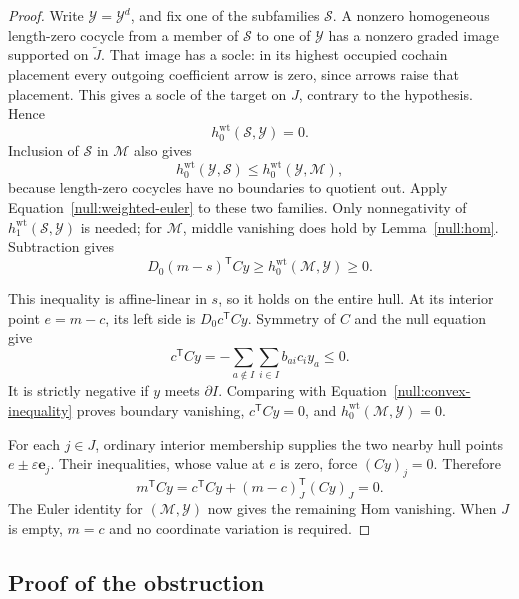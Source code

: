\begin{proof}
Write $\mathcal Y=\mathcal Y^d$, and fix one of the subfamilies
$\mathcal S$.  A nonzero homogeneous length-zero cocycle from a
member of $\mathcal S$ to one of $\mathcal Y$ has a nonzero graded
image supported on $\widetilde J$.  That image has a socle: in its
highest occupied cochain placement every outgoing coefficient arrow
is zero, since arrows raise that placement.  This gives a socle of
the target on $J$, contrary to the hypothesis.  Hence
\[
 h_0^{\mathrm{wt}}(\mathcal S,\mathcal Y)=0.
\]
Inclusion of $\mathcal S$ in $\mathcal M$ also gives
\[
 h_0^{\mathrm{wt}}(\mathcal Y,\mathcal S)
   \le h_0^{\mathrm{wt}}(\mathcal Y,\mathcal M),
\]
because length-zero cocycles have no boundaries to quotient out.
Apply Equation~\eqref{null:weighted-euler} to these two families.
Only nonnegativity of $h_1^{\mathrm{wt}}(\mathcal S,\mathcal Y)$
is needed; for $\mathcal M$, middle vanishing does hold by
Lemma~\ref{null:hom}.  Subtraction gives
\begin{equation}
 D_0(m-s)^{\mathsf T}Cy
     \ge h_0^{\mathrm{wt}}(\mathcal M,\mathcal Y)\ge0.
 \label{null:convex-inequality}
\end{equation}

This inequality is affine-linear in $s$, so it holds on the entire
hull.  At its interior point $e=m-c$, its left side is
$D_0c^{\mathsf T}Cy$.  Symmetry of $C$ and the null equation give
\begin{equation}
 c^{\mathsf T}Cy
    =-\sum_{a\notin I}\sum_{i\in I}b_{ai}c_i y_a\le0.
 \label{null:boundary-sign}
\end{equation}
It is strictly negative if $y$ meets $\partial I$.  Comparing with
Equation~\eqref{null:convex-inequality} proves boundary vanishing,
$c^{\mathsf T}Cy=0$, and
$h_0^{\mathrm{wt}}(\mathcal M,\mathcal Y)=0$.

For each $j\in J$, ordinary interior membership supplies the two
nearby hull points $e\pm\varepsilon\mathbf e_j$.  Their inequalities,
whose value at $e$ is zero, force $(Cy)_j=0$.  Therefore
\[
 m^{\mathsf T}Cy
   =c^{\mathsf T}Cy+(m-c)_J^{\mathsf T}(Cy)_J=0.
\]
The Euler identity for $(\mathcal M,\mathcal Y)$ now gives the
remaining Hom vanishing.  When $J$ is empty, $m=c$ and no coordinate
variation is required.
\end{proof}

\subsection{Proof of the obstruction}

